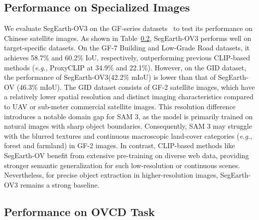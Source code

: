 \documentclass[twocolumn,switch,times]{article}
\newcommand{\samov}{SegEarth-OV\textcolor{cvprpink}{3}\xspace}
\begin{document}
\subsection{Performance on Specialized Images}
We evaluate \samov on the GF-series datasets~\citep{chen2022introduction} to test its performance on Chinese  satellite images. As shown in Table~\ref{}, \samov performs well on target-specific datasets. On the GF-7 Building and Low-Grade Road datasets, it achieves 58.7\% and 60.2\% IoU, respectively, outperforming previous CLIP-based methods (\textit{e.g.}, ProxyCLIP at 34.9\% and 22.1\%).
However, on the GID dataset, the performance of \samov (42.2\% mIoU) is lower than that of SegEarth-OV (46.3\% mIoU). The GID dataset consists of GF-2 satellite images, which have a relatively lower spatial resolution and distinct imaging characteristics compared to UAV or sub-meter commercial satellite images. This resolution difference introduces a notable domain gap for SAM 3, as the model is primarily trained on natural images with sharp object boundaries. Consequently, SAM 3 may struggle with the blurred textures and continuous macroscopic land-cover categories (\textit{e.g.}, forest and farmland) in GF-2 images. In contrast, CLIP-based methods like SegEarth-OV benefit from extensive pre-training on diverse web data, providing stronger semantic generalization for such low-resolution or continuous scenes. Nevertheless, for precise object extraction in higher-resolution images, \samov remains a strong baseline.

\subsection{Performance on OVCD Task}
\end{document}
